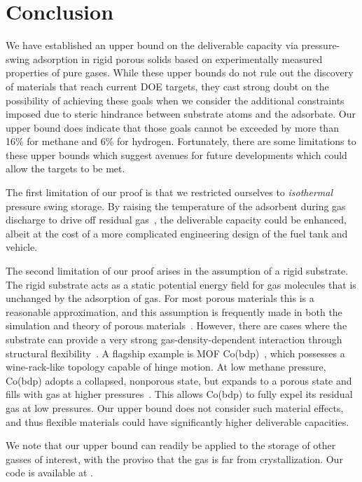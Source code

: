\section{Conclusion}
We have established an upper bound on the deliverable capacity via
pressure-swing adsorption in rigid porous solids based on experimentally
measured properties of pure gases. While these upper bounds do not rule out the
discovery of materials that reach current DOE targets, they cast strong doubt
on the possibility of achieving these goals when we consider the additional
constraints imposed due to steric hindrance between substrate atoms and the
adsorbate. Our upper bound does indicate that those goals cannot be exceeded by
more than 16\% for methane and 6\% for hydrogen. Fortunately, there are some
limitations to these upper bounds which suggest avenues for future developments
which could allow the targets to be met.

The first limitation of our proof is that we restricted ourselves to
\emph{isothermal} pressure swing storage. By raising the temperature of the
adsorbent during gas discharge to drive off residual
gas~\cite{gomez2014exploring}, the deliverable capacity could be enhanced,
albeit at the cost of a more complicated engineering design of the fuel tank
and vehicle.

The second limitation of our proof arises in the assumption of a rigid
substrate. The rigid substrate acts as a static potential energy field for gas
molecules that is unchanged by the adsorption of gas. For most porous materials
this is a reasonable approximation, and this assumption is frequently made in
both the simulation and theory of porous materials~\cite{witman2017influence}.
However, there are cases where the substrate can provide a very strong
gas-density-dependent interaction through structural
flexibility~\cite{schneemann2014flexible}. A flagship example is MOF
Co(bdp)~\cite{choi2008broadly}, which possesses a wine-rack-like topology
capable of hinge motion. At low methane pressure, Co(bdp) adopts a collapsed,
nonporous state, but expands to a porous state and fills with gas at higher
pressures~\cite{mason2015methane}. This allows Co(bdp) to fully expel its
residual gas at low pressures. Our upper bound does not consider such material
effects, and thus flexible materials could have significantly higher
deliverable capacities.

We note that our upper bound can readily be applied to the storage of other
gasses of interest, with the proviso that the gas is far from crystallization.
Our code is available at .
